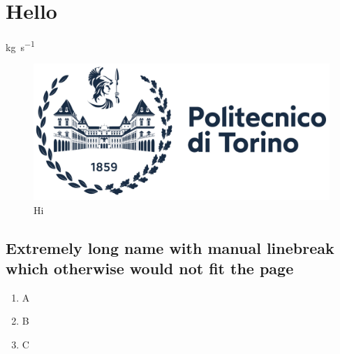 \chapter{Hello}
\label{sec:hello}

\cite[Hi][Goofy]{IEEEexample:article_typical}

\si{\kilo\gram\per\second}

\begin{figure}[h]
\centering
\includegraphics[width=.9\linewidth]{images/logo/polito_logo_2021_blu.jpg}
\caption{Hi}
\label{fig:hi}
\end{figure}

\section[Extremely long name with manual linebreak which otherwise would not fit the page]{Extremely long name with manual linebreak\\which otherwise would not fit the page} %

\begin{enumerate}
    \item A
    \item B
    \item C
\end{enumerate}

